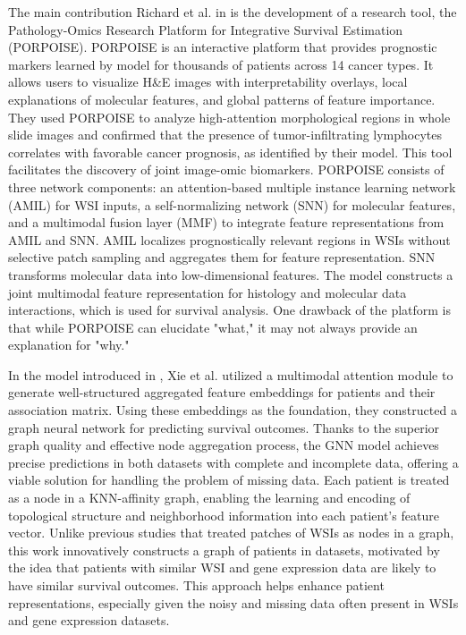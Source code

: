 \documentclass[journal,twoside,web]{ieeecolor}
\begin{document}
The main contribution Richard et al. in \cite{chen2022pan} is the development of a research tool, the Pathology-Omics Research Platform for Integrative Survival Estimation (PORPOISE). 
PORPOISE is an interactive platform that provides prognostic markers learned by model for thousands of patients across 14 cancer types. 
It allows users to visualize H\&E images with interpretability overlays, local explanations of molecular features, and global patterns of feature importance. 
They used PORPOISE to analyze high-attention morphological regions in whole slide images and confirmed that the presence of tumor-infiltrating lymphocytes correlates with favorable cancer prognosis, as identified by their model. 
This tool facilitates the discovery of joint image-omic biomarkers.
PORPOISE consists of three network components: an attention-based multiple instance learning network (AMIL) for WSI inputs, a self-normalizing network (SNN) for molecular features, and a multimodal fusion layer (MMF) to integrate feature representations from AMIL and SNN.  
AMIL localizes prognostically relevant regions in WSIs without selective patch sampling and aggregates them for feature representation.  
SNN transforms molecular data into low-dimensional features.  
The model constructs a joint multimodal feature representation for histology and molecular data interactions, which is used for survival analysis.
One drawback of the platform is that while PORPOISE can elucidate "what," it may not always provide an explanation for "why."

In the model introduced in \cite{xie2022survival}, Xie et al. utilized a multimodal attention module to generate well-structured aggregated feature embeddings for patients and their association matrix. 
Using these embeddings as the foundation, they constructed a graph neural network for predicting survival outcomes.
Thanks to the superior graph quality and effective node aggregation process, the GNN model achieves precise predictions in both datasets with complete and incomplete data, offering a viable solution for handling the problem of missing data.
Each patient is treated as a node in a KNN-affinity graph, enabling the learning and encoding of topological structure and neighborhood information into each patient's feature vector.  
Unlike previous studies that treated patches of WSIs as nodes in a graph, this work innovatively constructs a graph of patients in datasets, motivated by the idea that patients with similar WSI and gene expression data are likely to have similar survival outcomes.  
This approach helps enhance patient representations, especially given the noisy and missing data often present in WSIs and gene expression datasets.
\end{document}
